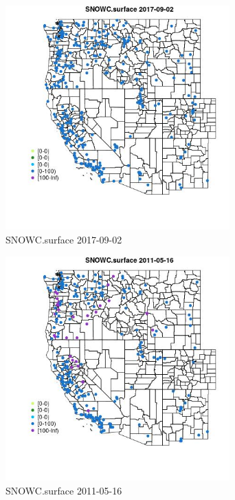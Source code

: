 \begin{figure} 
\centering  
\includegraphics[width=0.77\textwidth]{Code_Outputs/Report_ML_input_PM25_Step4_part_e_de_duplicated_aves_compiled_2019-05-20wNAs_MapObsSNOWCsurface2017-09-02.jpg} 
\caption{\label{fig:Report_ML_input_PM25_Step4_part_e_de_duplicated_aves_compiled_2019-05-20wNAsMapObsSNOWCsurface2017-09-02}SNOWC.surface 2017-09-02} 
\end{figure} 
 

\begin{figure} 
\centering  
\includegraphics[width=0.77\textwidth]{Code_Outputs/Report_ML_input_PM25_Step4_part_e_de_duplicated_aves_compiled_2019-05-20wNAs_MapObsSNOWCsurface2011-05-16.jpg} 
\caption{\label{fig:Report_ML_input_PM25_Step4_part_e_de_duplicated_aves_compiled_2019-05-20wNAsMapObsSNOWCsurface2011-05-16}SNOWC.surface 2011-05-16} 
\end{figure} 
 


